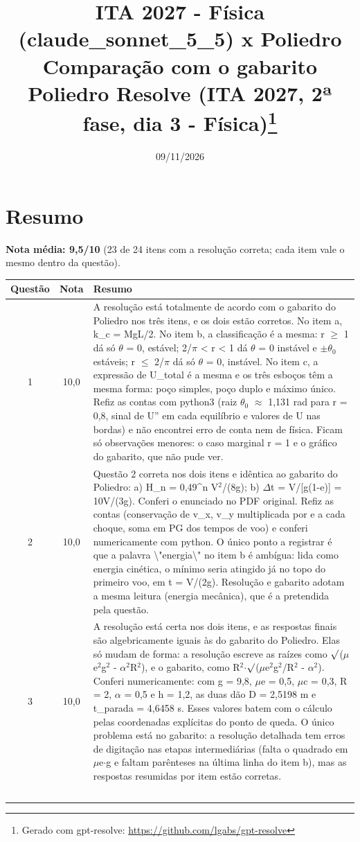 \documentclass{article}%
\title{ITA 2027 {-} Física (claude\_sonnet\_5\_5) x Poliedro\\[4pt]\large Comparação com o gabarito Poliedro Resolve (ITA 2027, 2ª fase, dia 3 {-} Física)\thanks{Gerado com gpt-resolve: \url{https://github.com/lgabs/gpt-resolve}}}%
\date{09/11/2026}%
\begin{document}
%
\normalsize%
\maketitle%
\section*{Resumo}\textbf{Nota média: 9,5/10} (23 de 24 itens com a resolução correta; cada item vale o mesmo dentro da questão).\par\medskip%
\begin{longtable}{@{}c c p{}@{}}\toprule Questão & Nota & Resumo \\ \midrule
1 & 10,0 & A resolução está totalmente de acordo com o gabarito do Poliedro nos três itens, e os dois estão corretos. No item a, k\_c = MgL/2. No item b, a classificação é a mesma: r $\geq$ 1 dá só $\theta$ = 0, estável; 2/$\pi$ < r < 1 dá $\theta$ = 0 instável e $\pm$$\theta$$_{0}$ estáveis; r $\leq$ 2/$\pi$ dá só $\theta$ = 0, instável. No item c, a expressão de U\_total é a mesma e os três esboços têm a mesma forma: poço simples, poço duplo e máximo único. Refiz as contas com python3 (raiz $\theta$$_{0}$ $\approx$ 1,131 rad para r = 0,8, sinal de U'' em cada equilíbrio e valores de U nas bordas) e não encontrei erro de conta nem de física. Ficam só observações menores: o caso marginal r = 1 e o gráfico do gabarito, que não pude ver. \\
2 & 10,0 & Questão 2 correta nos dois itens e idêntica ao gabarito do Poliedro: a) H\_n = 0,49\^{}n V$^2$/(8g); b) $\Delta$t = V/{[}g(1-e){]} = 10V/(3g). Conferi o enunciado no PDF original. Refiz as contas (conservação de v\_x, v\_y multiplicada por e a cada choque, soma em PG dos tempos de voo) e conferi numericamente com python. O único ponto a registrar é que a palavra \textbackslash{}"energia\textbackslash{}" no item b é ambígua: lida como energia cinética, o mínimo seria atingido já no topo do primeiro voo, em t = V/(2g). Resolução e gabarito adotam a mesma leitura (energia mecânica), que é a pretendida pela questão. \\
3 & 10,0 & A resolução está certa nos dois itens, e as respostas finais são algebricamente iguais às do gabarito do Poliedro. Elas só mudam de forma: a resolução escreve as raízes como $\surd$($\mu$e$^2$g$^2$ - $\alpha$$^2$R$^2$), e o gabarito, como R$^2$$\cdot$$\surd$($\mu$e$^2$g$^2$/R$^2$ - $\alpha$$^2$). Conferi numericamente: com g = 9,8, $\mu$e = 0,5, $\mu$c = 0,3, R = 2, $\alpha$ = 0,5 e h = 1,2, as duas dão D = 2,5198 m e t\_parada = 4,6458 s. Esses valores batem com o cálculo pelas coordenadas explícitas do ponto de queda. O único problema está no gabarito: a resolução detalhada tem erros de digitação nas etapas intermediárias (falta o quadrado em $\mu$e$\cdot$g e faltam parênteses na última linha do item b), mas as respostas resumidas por item estão corretas. \\
$$
\end{longtable}
\end{document}

